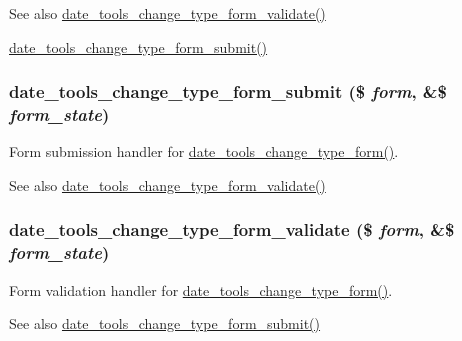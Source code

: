 \begin{DoxySeeAlso}{See also}
\hyperlink{date__tools_8change__type_8inc_a537d4733f1472548340d382657ce2665}{date\_\-tools\_\-change\_\-type\_\-form\_\-validate()} 

\hyperlink{date__tools_8change__type_8inc_aa4d27716963ad04ea751a1deeb3daa28}{date\_\-tools\_\-change\_\-type\_\-form\_\-submit()} 
\end{DoxySeeAlso}
\hypertarget{date__tools_8change__type_8inc_aa4d27716963ad04ea751a1deeb3daa28}{
\subsubsection[{date\_\-tools\_\-change\_\-type\_\-form\_\-submit}]{\setlength{\rightskip}{0pt plus 5cm}date\_\-tools\_\-change\_\-type\_\-form\_\-submit (\$ {\em form}, \/  \&\$ {\em form\_\-state})}}
\label{date__tools_8change__type_8inc_aa4d27716963ad04ea751a1deeb3daa28}
Form submission handler for \hyperlink{date__tools_8change__type_8inc_a3625710b4303ee2a2ac8ce19515e28fe}{date\_\-tools\_\-change\_\-type\_\-form()}.

\begin{DoxySeeAlso}{See also}
\hyperlink{date__tools_8change__type_8inc_a537d4733f1472548340d382657ce2665}{date\_\-tools\_\-change\_\-type\_\-form\_\-validate()} 
\end{DoxySeeAlso}
\hypertarget{date__tools_8change__type_8inc_a537d4733f1472548340d382657ce2665}{
\subsubsection[{date\_\-tools\_\-change\_\-type\_\-form\_\-validate}]{\setlength{\rightskip}{0pt plus 5cm}date\_\-tools\_\-change\_\-type\_\-form\_\-validate (\$ {\em form}, \/  \&\$ {\em form\_\-state})}}
\label{date__tools_8change__type_8inc_a537d4733f1472548340d382657ce2665}
Form validation handler for \hyperlink{date__tools_8change__type_8inc_a3625710b4303ee2a2ac8ce19515e28fe}{date\_\-tools\_\-change\_\-type\_\-form()}.

\begin{DoxySeeAlso}{See also}
\hyperlink{date__tools_8change__type_8inc_aa4d27716963ad04ea751a1deeb3daa28}{date\_\-tools\_\-change\_\-type\_\-form\_\-submit()} 
\end{DoxySeeAlso}
